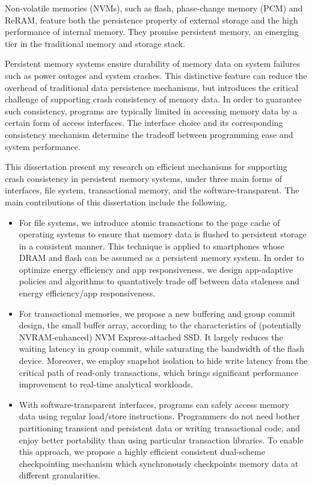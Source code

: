 \begin{eabstract}

Non-volatile memories (NVMs), such as flash, phase-change memory (PCM) and ReRAM, feature both the persistence property of external storage and the high performance of internal memory. They promise persistent memory, an emerging tier in the traditional memory and storage stack.

Persistent memory systems ensure durability of memory data on system failures such as power outages and system crashes. This distinctive feature can reduce the overhead of traditional data persistence mechanisms, but introduces the critical challenge of supporting crash consistency of memory data. In order to guarantee such consistency, programs are typically limited in accessing memory data by a certain form of access interfaces. The interface choice and its corresponding consistency mechanism determine the tradeoff between programming ease and system performance.

This dissertation present my research on efficient mechanisms for supporting crash consistency in persistent memory systems, under three main forms of interfaces, file system, transactional memory, and the software-transparent. The main contributions of this dissertation include the following.

\begin{itemize}
\item For file systems, we introduce atomic transactions to the page cache of operating systems to ensure that memory data is flushed to persistent storage in a consistent manner. This technique is applied to smartphones whose DRAM and flash can be assumed as a persistent memory system. In order to optimize energy efficiency and app responsiveness, we design app-adaptive policies and algorithms to quantatively trade off between data staleness and energy efficiency/app responsiveness.

\item For transactional memories, we propose a new buffering and group commit design, the small buffer array, according to the characteristics of (potentially NVRAM-enhanced) NVM Express-attached SSD. It largely reduces the waiting latency in group commit, while saturating the bandwidth of the flash device. Moreover, we employ snapshot isolation to hide write latency from the critical path of read-only transactions, which brings significant performance improvement to real-time analytical workloads.

\item With software-transparent interfaces, programs can safely access memory data using regular load/store instructions. Programmers do not need bother partitioning transient and persistent data or writing transactional code, and enjoy better portability than using particular transaction libraries. To enable this approach, we propose a highly efficient consistent dual-scheme checkpointing mechanism which synchronously checkpoints memory data at different granularities.


\end{itemize}
\end{eabstract}

